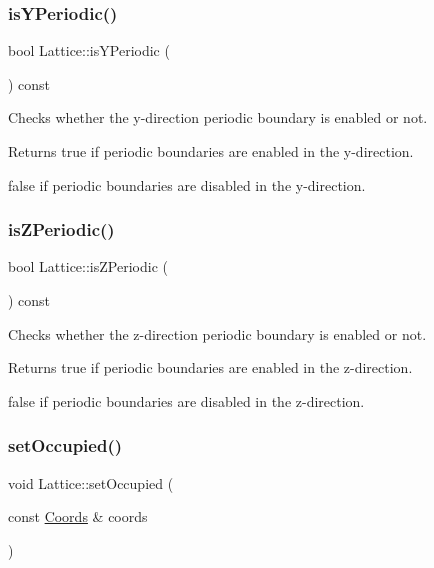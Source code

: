 \subsubsection{\texorpdfstring{is\+Y\+Periodic()}{isYPeriodic()}}
{\footnotesize\ttfamily bool Lattice\+::is\+Y\+Periodic (\begin{DoxyParamCaption}{ }\end{DoxyParamCaption}) const}



Checks whether the y-\/direction periodic boundary is enabled or not. 

\begin{DoxyReturn}{Returns}
true if periodic boundaries are enabled in the y-\/direction. 

false if periodic boundaries are disabled in the y-\/direction. 
\end{DoxyReturn}
\mbox{\label{class_lattice_ad7dd1b12a253e506aba5cedb57bf86ea}} 
\subsubsection{\texorpdfstring{is\+Z\+Periodic()}{isZPeriodic()}}
{\footnotesize\ttfamily bool Lattice\+::is\+Z\+Periodic (\begin{DoxyParamCaption}{ }\end{DoxyParamCaption}) const}



Checks whether the z-\/direction periodic boundary is enabled or not. 

\begin{DoxyReturn}{Returns}
true if periodic boundaries are enabled in the z-\/direction. 

false if periodic boundaries are disabled in the z-\/direction. 
\end{DoxyReturn}
\mbox{\label{class_lattice_a515b8bc548ef4a87c3495a7352a60399}} 
\subsubsection{\texorpdfstring{set\+Occupied()}{setOccupied()}}
{\footnotesize\ttfamily void Lattice\+::set\+Occupied (\begin{DoxyParamCaption}\item[{const \hyperlink{struct_coords}{Coords} \&}]{coords }\end{DoxyParamCaption})}



